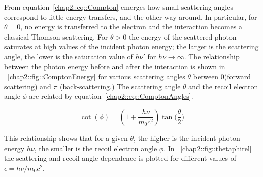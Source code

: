 From equation~\ref{chap2::eq::Compton} emerges how small scattering angles correspond to little energy transfers, and the other way around. In particular, for $\theta = 0$, no energy is transferred to the electron and the interaction becomes a classical Thomson scattering. For $\theta > 0$ the energy of the scattered photon saturates at high values of the incident photon energy; the larger is the scattering angle, the lower is the saturation value of $h\nu'$ for $h\nu \rightarrow \infty$.
The relationship between the photon energy before and after the interaction is shown in \figurename~\ref{chap2::fig::ComptonEnergy} for various scattering angles $\theta$ between 0\textdegree (forward scattering) and $\pi$ (back-scattering.) 
The scattering angle $\theta$ and the recoil electron angle $\phi$ are related by equation~\ref{chap2::eq::ComptonAngles}.

\begin{equation}
\cot(\phi) = \left(1+\frac{h\nu}{m_{0}c^2}\right)\tan\bigg(\frac{\theta}{2}\bigg)
\label{chap2::eq::ComptonAngles}
\end{equation} 

This relationship shows that for a given $\theta$, the higher is the incident photon energy $h\nu$, the smaller is the recoil electron angle $\phi$. In \figurename~\ref{chap2::fig::thetaphirel} the scattering and recoil angle dependence is plotted for different values of $\epsilon = h\nu / m_{0}c^2$.

